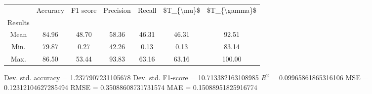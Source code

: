 \begin{tabular}{|c|c|c|c|c|c|c|}
\toprule
{} &  Accuracy &  F1 score &  Precision &  Recall &  \$T\_\{\textbackslash mu\}\$ &  \$T\_\{\textbackslash gamma\}\$ \\
Results &           &           &            &         &            &               \\
\hline
Mean    &     84.96 &     48.70 &      58.36 &   46.31 &      46.31 &         92.51 \\
Min.    &     79.87 &      0.27 &      42.26 &    0.13 &       0.13 &         83.14 \\
Max.    &     86.50 &     53.44 &      93.83 &   63.16 &      63.16 &        100.00 \\
\bottomrule
\end{tabular}

 Dev. std. accuracy = 1.2377907231105678
 Dev. std. F1-score = 10.713382163108985
 $R^2$ = 0.09965861865316106
 MSE = 0.12312104627285494
 RMSE = 0.35088608731731574
 MAE = 0.15088951825916774